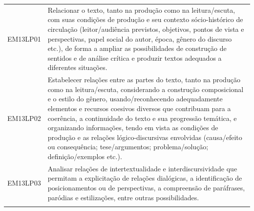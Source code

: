 \documentclass[12pt]{extarticle}
\begin{document}
\begin{longtable}{ll}
EM13LP01   & Relacionar o texto, tanto na produção como na leitura/escuta, com suas condições de produção e seu contexto sócio-histórico de circulação (leitor/audiência previstos, objetivos, pontos de vista e perspectivas, papel social do autor, época, gênero do discurso etc.), de forma a ampliar as possibilidades de construção de sentidos e de análise crítica e produzir textos adequados a diferentes situações.                                                                                                                                                                                                                                                                                                                                                                                                     \\
\rowcolor[HTML]{FFF} 
EM13LP02   & Estabelecer relações entre as partes do texto, tanto na produção como na leitura/escuta, considerando a construção composicional e o estilo do gênero, usando/reconhecendo adequadamente elementos e recursos coesivos diversos que contribuam para a coerência, a continuidade do texto e sua progressão temática, e organizando informações, tendo em vista as condições de produção e as relações lógico-discursivas envolvidas (causa/efeito ou consequência; tese/argumentos; problema/solução; definição/exemplos etc.).                                                                                                                                                                                                                                                                                        \\
\rowcolor[HTML]{E0F7FA} 
EM13LP03   & Analisar relações de intertextualidade e interdiscursividade que permitam a explicitação de relações dialógicas, a identificação de posicionamentos ou de perspectivas, a compreensão de paráfrases, paródias e estilizações, entre outras possibilidades.                                                                                                                                                                                                                                                                                                                                                                                                                                                                                                                                                            \\
\rowcolor[HTML]{FFF} 

\end{longtable}
\end{document}
